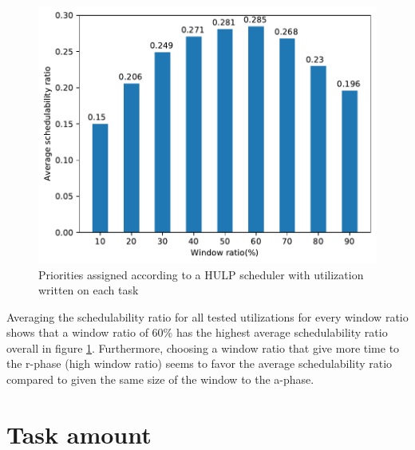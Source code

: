 \documentclass{kththesis}
\begin{document}
\begin{figure}[H]

    \centering

    \includegraphics[width=1.0\linewidth]{images/window_ratio_averages.pdf}

    \caption{Priorities assigned according to a HULP scheduler with utilization written on each task}

    \label{fig:window_ratio_averages}

\end{figure}

Averaging the schedulability ratio for all tested utilizations for every window ratio shows that a
window ratio of 60\% has the highest average schedulability ratio overall in figure
\ref{fig:window_ratio_averages}. Furthermore, choosing a window ratio that give more time to the
\acrshort{r}-phase (high window ratio) seems to favor the average schedulability ratio compared to
given the same size of the window to the \acrshort{a}-phase.

\section{Task amount} \label{sec:task_amount}
\end{document}
